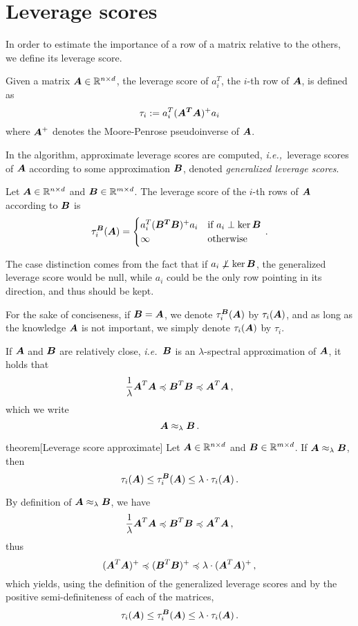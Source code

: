 \section{Leverage scores}
In order to estimate the importance of a row of a matrix relative to the others,
we define its leverage score.
\begin{definition}\label{def:leverage-score}
Given a matrix $\boldsymbol A \in \mathbb R^{n \times d}$, the leverage score of $a_i^T$,
the $i$-th row of $\boldsymbol A$, is defined as
$$
\tau_i := a_i^T (\boldsymbol {A^TA})^+ a_i
$$
where $\boldsymbol A^+$ denotes the Moore-Penrose pseudoinverse of $\boldsymbol A$.
\end{definition}

In the algorithm, approximate leverage scores are computed, \textit{i.e.,\ }leverage scores of $\boldsymbol A$ according to some approximation $\boldsymbol B$, denoted \textit{generalized leverage scores}.

\begin{definition}
Let $\boldsymbol A \in \mathbb R ^{n \times d}$ and $\boldsymbol B \in \mathbb R^{m \times d}$. The
leverage score of the $i$-th rows of $\boldsymbol A$ according to $\boldsymbol B$ is
$$
\tau_i^{\boldsymbol B}(\boldsymbol A) =
    \begin{cases}
        a_i^T(\boldsymbol{B ^T B})^+a_i & \text{if } a_i \perp \ker \boldsymbol B \\
        \infty & \text{otherwise}
    \end{cases} \, .
$$
\end{definition}

The case distinction comes from the fact that if $a_i \not\perp \ker \boldsymbol B$, the
generalized leverage score would be null, while $a_i$ could be the only row
pointing in its direction, and thus should be kept.

For the sake of conciseness, if $\boldsymbol B = \boldsymbol A$, we denote $\tau_i^{\boldsymbol B}(\boldsymbol A)$ by
$\tau_i(\boldsymbol A)$, and as long as the knowledge $\boldsymbol A$ is not important, we simply
denote $\tau_i(\boldsymbol A)$ by $\tau_i$.

If $\boldsymbol A$ and $\boldsymbol B$ are relatively close, \textit{i.e.\ }$\boldsymbol B$ is an
$\lambda$-spectral approximation of $\boldsymbol A$, it holds that
$$
\frac{1}{\lambda} \boldsymbol A^T\boldsymbol A \preccurlyeq \boldsymbol B^T\boldsymbol B \preccurlyeq \boldsymbol A^T\boldsymbol A \, ,
$$
which we write
$$
\boldsymbol A \approx_\lambda \boldsymbol B \, .
$$
\begin{theoremEnd}{theorem}[Leverage score approximate]
    Let $\boldsymbol A \in \mathbb R ^{n \times d}$ and $\boldsymbol B \in \mathbb R^{m \times d}$. If
    $\boldsymbol A \approx_\lambda \boldsymbol B$, then
    $$
        \tau_i(\boldsymbol A) \leq \tau_i^{\boldsymbol B}(\boldsymbol A) \leq \lambda \cdot \tau_i(\boldsymbol A) \, .
    $$
\end{theoremEnd}
\begin{proofEnd}
    By definition of $\boldsymbol A \approx_\lambda \boldsymbol B$, we have
$$
    \frac{1}{\lambda} \boldsymbol A^T\boldsymbol A \preccurlyeq \boldsymbol B^T\boldsymbol B \preccurlyeq \boldsymbol A^T\boldsymbol A \, ,
$$
    thus
$$
    (\boldsymbol A^T\boldsymbol A)^+ \preccurlyeq (\boldsymbol B^T\boldsymbol B)^+ \preccurlyeq \lambda \cdot (\boldsymbol A^T\boldsymbol A)^+ \, ,
$$
    which yields, using the definition of the generalized leverage scores and
    by the positive semi-definiteness of each of the matrices,
$$
    \tau_i(\boldsymbol A) \leq \tau_i^{\boldsymbol B}(\boldsymbol A) \leq \lambda \cdot \tau_i(\boldsymbol A) \, .
$$

\end{proofEnd}
